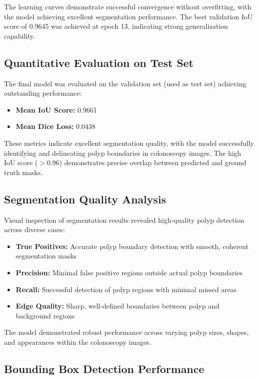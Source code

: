 \documentclass[a4paper,12pt]{report}
\begin{document}
The learning curves demonstrate successful convergence without overfitting, with the model achieving excellent segmentation performance. The best validation IoU score of 0.9645 was achieved at epoch 13, indicating strong generalization capability.

\subsection{Quantitative Evaluation on Test Set}

The final model was evaluated on the validation set (used as test set) achieving outstanding performance:

\begin{itemize}
    \item \textbf{Mean IoU Score:} 0.9661
    \item \textbf{Mean Dice Loss:} 0.0438
\end{itemize}

These metrics indicate excellent segmentation quality, with the model successfully identifying and delineating polyp boundaries in colonoscopy images. The high IoU score ($>$0.96) demonstrates precise overlap between predicted and ground truth masks.

\subsection{Segmentation Quality Analysis}

Visual inspection of segmentation results revealed high-quality polyp detection across diverse cases:

\begin{itemize}
    \item \textbf{True Positives:} Accurate polyp boundary detection with smooth, coherent segmentation masks
    \item \textbf{Precision:} Minimal false positive regions outside actual polyp boundaries
    \item \textbf{Recall:} Successful detection of polyp regions with minimal missed areas
    \item \textbf{Edge Quality:} Sharp, well-defined boundaries between polyp and background regions
\end{itemize}

The model demonstrated robust performance across varying polyp sizes, shapes, and appearances within the colonoscopy images.

\subsection{Bounding Box Detection Performance}
\end{document}
